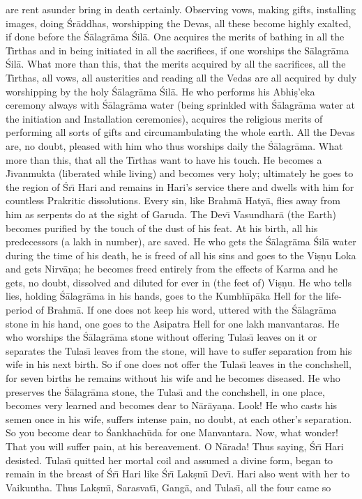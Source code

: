 are rent asunder bring in death certainly. Observing vows, making gifts, installing images, doing \'Sr\=addhas, worshipping the Devas, all these become highly exalted, if done before the \'S\=alagr\=ama \'Sil\=a. One acquires the merits of bathing in all the T\={\i}rthas and in being initiated in all the sacrifices, if one worships the S\=alagr\=ama \'Sil\=a. What more than this, that the merits acquired by all the sacrifices, all the T\={\i}rthas, all vows, all austerities and reading all the Vedas are all acquired by duly worshipping by the holy \'S\=alagr\=ama \'Sil\=a. He who performs his Abhi\d{s}'eka ceremony always with \'S\=alagr\=ama water (being sprinkled with \'S\=alagr\=ama water at the initiation and Installation ceremonies), acquires the religious merits of performing all sorts of gifts and circumambulating the whole earth. All the Devas are, no doubt, pleased with him who thus worships daily the \'S\=alagr\=ama. What more than this, that all the T\={\i}rthas want to have his touch. He becomes a J\={\i}vanmukta (liberated while living) and becomes very holy; ultimately he goes to the region of \'Sr\={\i} Hari and remains in Hari's service there and dwells with him for countless Prakritic dissolutions. Every sin, like Brahm\=a Haty\=a, flies away from him as serpents do at the sight of Garuda. The Dev\={\i} Vasundhar\=a (the Earth) becomes purified by the touch of the dust of his feat. At his birth, all his predecessors (a lakh in number), are saved. He who gets the \'S\=alagr\=ama \'Sil\=a water during the time of his death, he is freed of all his sins and goes to the Vi\d{s}\d{n}u Loka and gets Nirv\=a\d{n}a; he becomes freed entirely from the effects of Karma and he gets, no doubt, dissolved and diluted for ever in (the feet of) Vi\d{s}\d{n}u. He who tells lies, holding \'S\=alagr\=ama in his hands, goes to the Kumbh\={\i}p\=aka Hell for the life-period of Brahm\=a. If one does not keep his word, uttered with the \'S\=alagr\=ama stone in his hand, one goes to the Asipatra Hell for one lakh manvantaras. He who worships the \'S\=alagr\=ama stone without offering Tulas\={\i} leaves on it or separates the Tulas\={\i} leaves from the stone, will have to suffer separation from his wife in his next birth. So if one does not offer the Tulas\={\i} leaves in the conchshell, for seven births he remains without his wife and he becomes diseased. He who preserves the \'S\=alagr\=ama stone, the Tulas\={\i} and the conchshell, in one place, becomes very learned and becomes dear to N\=ar\=aya\d{n}a. Look! He who casts his semen once in his wife, suffers intense pain, no doubt, at each other's separation. So you become dear to \'Sankhach\=uda for one Manvantara. Now, what wonder! That you will suffer pain, at his bereavement. O N\=arada! Thus saying, \'Sr\={\i} Hari desisted. Tulas\={\i} quitted her mortal coil and assumed a divine form, began to remain in the breast of \'Sr\={\i} Hari like \'Sr\={\i} Lak\d{s}m\={\i} Dev\={\i}. Hari also went with her to Vaikuntha. Thus Lak\d{s}m\={\i}, Sarasvat\={\i}, Gang\=a, and Tulas\={\i}, all the four came so

